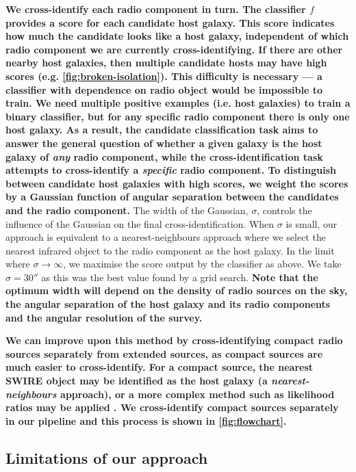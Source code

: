 \documentclass[fleqn,usenatbib,usedcolumn]{mnras}
\newcommand{\edited}[1]{{\bf {#1}}}
\begin{document}
    \edited{We cross-identify each radio component in turn. The classifier $f$
    provides a score for each candidate host galaxy. This score indicates how
    much the candidate looks like a host galaxy, independent of which radio
    component we are currently cross-identifying. If there are other nearby host
    galaxies, then multiple candidate hosts may have high scores (e.g.
    \autoref{fig:broken-isolation}). This difficulty is necessary --- a classifier
    with dependence on radio object would be impossible to train. We
    need multiple positive examples (i.e. host galaxies) to train a binary classifier, but
    for any specific radio component there is only one host galaxy. As a
    result, the candidate classification task aims to answer the general question
    of whether a given galaxy is the host galaxy of \emph{any} radio
    component, while the cross-identification task attempts to cross-identify
    a \emph{specific} radio component. To distinguish between candidate host
    galaxies with high scores, we weight the scores by a Gaussian function of
    angular separation between the candidates and the radio component.} The
    width of the Gaussian, $\sigma$, controls the influence of the Gaussian on
    the final cross-identification. When $\sigma$ is small, our approach is
    equivalent to a nearest-neighbours approach where we select the nearest
    infrared object to the radio component as the host galaxy. In the limit
    where $\sigma \to \infty$, we maximise the score output by the
    classifier as above. We take $\sigma = 30''$ as this was the best value
    found by a grid search. \edited{Note that the optimum width will depend on
    the density of radio sources on the sky, the angular separation of the
    host galaxy and its radio components and the angular resolution of the survey.}

    \edited{We can improve upon this method by cross-identifying compact radio sources
    separately from extended sources, as compact sources are much easier to
    cross-identify. For a compact source, the nearest SWIRE object may be
    identified as the host galaxy (a \emph{nearest-neighbours} approach), or a
    more complex method such as likelihood ratios may be applied
    \citep[see][]{weston18lrpy}. We cross-identify compact sources separately
    in our pipeline and this process is shown in \autoref{fig:flowchart}.}

  \subsection{Limitations of our approach}
    \label{sec:limitations}
\end{document}
